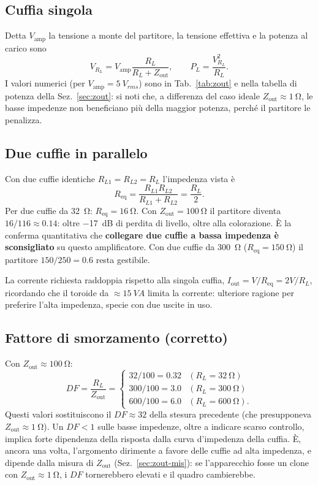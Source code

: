 \subsection{Cuffia singola}
Detta $V_{\text{amp}}$ la tensione a monte del partitore, la tensione
effettiva e la potenza al carico sono
\begin{equation}
  V_{R_L}=V_{\text{amp}}\frac{R_L}{R_L+Z_{\text{out}}},\qquad
  P_L=\frac{V_{R_L}^2}{R_L}.
\end{equation}
I valori numerici (per $V_{\text{amp}}=\SI{5}{V_{rms}}$) sono in
Tab.~\ref{tab:zout} e nella tabella di potenza della
Sez.~\ref{sec:zout}: si noti che, a differenza del caso ideale
$Z_{\text{out}}\approx\SI{1}{\ohm}$, le basse impedenze non beneficiano
più della maggior potenza, perché il partitore le penalizza.

\subsection{Due cuffie in parallelo}
Con due cuffie identiche $R_{L1}=R_{L2}=R_L$ l'impedenza vista è
\begin{equation}
  R_{\text{eq}}=\frac{R_{L1}R_{L2}}{R_{L1}+R_{L2}}=\frac{R_L}{2}.
\end{equation}
Per due cuffie da \SI{32}{\ohm}: $R_{\text{eq}}=\SI{16}{\ohm}$. Con
$Z_{\text{out}}=\SI{100}{\ohm}$ il partitore diventa $16/116\approx0.14$:
oltre \SI{-17}{dB} di perdita di livello, oltre alla colorazione. \`E la
conferma quantitativa che \textbf{collegare due cuffie a bassa impedenza è
sconsigliato} su questo amplificatore. Con due cuffie da \SI{300}{\ohm}
($R_{\text{eq}}=\SI{150}{\ohm}$) il partitore $150/250=0.6$ resta
gestibile.

La corrente richiesta raddoppia rispetto alla singola cuffia,
$I_{\text{out}}=V/R_{\text{eq}}=2V/R_L$, ricordando che il toroide da
$\approx\SI{15}{VA}$ limita la corrente: ulteriore ragione per preferire
l'alta impedenza, specie con due uscite in uso.

\subsection{Fattore di smorzamento (corretto)}
Con $Z_{\text{out}}\approx\SI{100}{\ohm}$:
\begin{equation}
  DF=\frac{R_L}{Z_{\text{out}}}=
  \begin{cases}
    32/100=0.32 & (R_L=\SI{32}{\ohm})\\[2pt]
    300/100=3.0 & (R_L=\SI{300}{\ohm})\\[2pt]
    600/100=6.0 & (R_L=\SI{600}{\ohm}).
  \end{cases}
\end{equation}
Questi valori sostituiscono il $DF\approx32$ della stesura precedente
(che presupponeva $Z_{\text{out}}\approx\SI{1}{\ohm}$). Un $DF<1$ sulle
basse impedenze, oltre a indicare scarso controllo, implica forte
dipendenza della risposta dalla curva d'impedenza della cuffia. \`E,
ancora una volta, l'argomento dirimente a favore delle cuffie ad alta
impedenza, e dipende dalla misura di $Z_{\text{out}}$
(Sez.~\ref{sec:zout-mis}): se l'apparecchio fosse un clone con
$Z_{\text{out}}\approx\SI{1}{\ohm}$, i $DF$ tornerebbero elevati e il
quadro cambierebbe.

